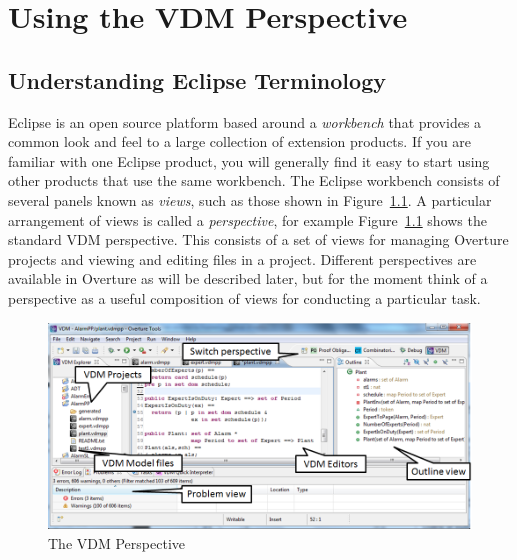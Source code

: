 \documentclass{overturerepchap}
\begin{document}
\chapter{Using the VDM Perspective}\label{sec:vdmsupport}

\section{Understanding Eclipse Terminology}

Eclipse is an open source platform based around a
\emph{workbench} that provides a common look and feel
to a large collection of extension products. If you are
familiar with one Eclipse product, you will generally find it easy to start
using other products that use the same workbench. The Eclipse workbench
consists of several panels known as \emph{views}, such as
those shown in Figure~\ref{fig:userguire:OverturePerspective}.
A particular arrangement of views
is called a \emph{perspective}, for example
Figure~\ref{fig:userguire:OverturePerspective} shows the standard
VDM perspective. This consists of a set of views for managing
Overture projects and viewing and editing files in a
project. Different perspectives are available in Overture as will be
described later, but for the moment think of a perspective as a
useful composition of views for conducting a particular task.

\begin{figure}[!h]
\begin{center}
  \includegraphics[width=\textwidth]{figures/OverturePerspective}
  \caption[labelInTOC]{The VDM Perspective}
  \label{fig:userguire:OverturePerspective}
\end{center}
\end{figure}
\end{document}
